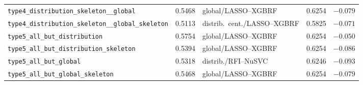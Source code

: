 {\begin{tabular}{>{\raggedright\arraybackslash}p{}r>{\raggedright\arraybackslash}p{}rr}
\texttt{type4\_\allowbreak distribution\_\allowbreak skeleton\_\allowbreak \_\allowbreak global}                       & 0.5468 & global/LASSO--XGBRF          & 0.6254 & $-0.079$ \\
\texttt{type4\_\allowbreak distribution\_\allowbreak skeleton\_\allowbreak \_\allowbreak global\_\allowbreak skeleton} & 0.5113 & distrib.\ cent./LASSO--XGBRF & 0.5825 & $-0.071$ \\
\midrule
\texttt{type5\_\allowbreak all\_\allowbreak but\_\allowbreak distribution}                                             & 0.5754 & global/LASSO--XGBRF          & 0.6254 & $-0.050$ \\
\texttt{type5\_\allowbreak all\_\allowbreak but\_\allowbreak distribution\_\allowbreak skeleton}                       & 0.5394 & global/LASSO--XGBRF          & 0.6254 & $-0.086$ \\
\texttt{type5\_\allowbreak all\_\allowbreak but\_\allowbreak global}                                                   & 0.5318 & distrib./RFI--NuSVC          & 0.6246 & $-0.093$ \\
\texttt{type5\_\allowbreak all\_\allowbreak but\_\allowbreak global\_\allowbreak skeleton}                             & 0.5468 & global/LASSO--XGBRF          & 0.6254 & $-0.079$ \\
\bottomrule
\end{tabular}}
